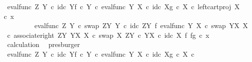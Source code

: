 \begin{isabellebody}
\ {\isachardoublequoteopen}{\isacharparenleft}{\kern0pt}{\isacharparenleft}{\kern0pt}{\isacharparenleft}{\kern0pt}eval{\isacharunderscore}{\kern0pt}func\ Z\ Y\ {\isasymcirc}\isactrlsub c\ {\isasymlangle}id\isactrlsub c\ Y{\isacharcomma}{\kern0pt}f\ {\isasymcirc}\isactrlsub c\ {\isasymbeta}\isactrlbsub Y\isactrlesub {\isasymrangle}{\isacharparenright}{\kern0pt}\ {\isasymcirc}\isactrlsub c\ eval{\isacharunderscore}{\kern0pt}func\ Y\ X\ {\isasymcirc}\isactrlsub c\ {\isasymlangle}id\isactrlsub c\ X{\isacharcomma}{\kern0pt}g\ {\isasymcirc}\isactrlsub c\ {\isasymbeta}\isactrlbsub X\isactrlesub {\isasymrangle}{\isacharparenright}{\kern0pt}\ {\isasymcirc}\isactrlsub c\ left{\isacharunderscore}{\kern0pt}cart{\isacharunderscore}{\kern0pt}proj\ X\ {\isasymone}{\isacharparenright}{\kern0pt}\ {\isasymcirc}\isactrlsub c\ x{}\ {\isacharequal}{\kern0pt}\isanewline
\ \ \ \ \ \ \ \ \ {\isacharparenleft}{\kern0pt}{\isacharparenleft}{\kern0pt}eval{\isacharunderscore}{\kern0pt}func\ Z\ Y\ {\isasymcirc}\isactrlsub c\ swap\ {\isacharparenleft}{\kern0pt}Z\isactrlbsup Y\isactrlesup {\isacharparenright}{\kern0pt}\ Y\ {\isasymcirc}\isactrlsub c\ {\isacharparenleft}{\kern0pt}id\isactrlsub c\ {\isacharparenleft}{\kern0pt}Z\isactrlbsup Y\isactrlesup {\isacharparenright}{\kern0pt}\ {\isasymtimes}\isactrlsub f\ eval{\isacharunderscore}{\kern0pt}func\ Y\ X\ {\isasymcirc}\isactrlsub c\ swap\ {\isacharparenleft}{\kern0pt}Y\isactrlbsup X\isactrlesup {\isacharparenright}{\kern0pt}\ X{\isacharparenright}{\kern0pt}\ {\isasymcirc}\isactrlsub c\ associate{\isacharunderscore}{\kern0pt}right\ {\isacharparenleft}{\kern0pt}Z\isactrlbsup Y\isactrlesup {\isacharparenright}{\kern0pt}\ {\isacharparenleft}{\kern0pt}Y\isactrlbsup X\isactrlesup {\isacharparenright}{\kern0pt}\ X\ {\isasymcirc}\isactrlsub c\ swap\ X\ {\isacharparenleft}{\kern0pt}Z\isactrlbsup Y\isactrlesup \ {\isasymtimes}\isactrlsub c\ Y\isactrlbsup X\isactrlesup {\isacharparenright}{\kern0pt}{\isacharparenright}{\kern0pt}\ {\isasymcirc}\isactrlsub c\ id\isactrlsub c\ X\ {\isasymtimes}\isactrlsub f\ {\isasymlangle}f{\isacharcomma}{\kern0pt}g{\isasymrangle}{\isacharparenright}{\kern0pt}\ {\isasymcirc}\isactrlsub c\ x{}{\isachardoublequoteclose}\isanewline
\ \ \ \ \ \ \isamarkupfalse%
\ calculation\ \isamarkupfalse%
\ presburger\isanewline
\ \ \isamarkupfalse%
\isanewline
\ \ \isamarkupfalse%
\ \isamarkupfalse%
\ {\isachardoublequoteopen}{\isacharparenleft}{\kern0pt}{\isacharparenleft}{\kern0pt}{\isacharparenleft}{\kern0pt}eval{\isacharunderscore}{\kern0pt}func\ Z\ Y\ {\isasymcirc}\isactrlsub c\ {\isasymlangle}id\isactrlsub c\ Y{\isacharcomma}{\kern0pt}f\ {\isasymcirc}\isactrlsub c\ {\isasymbeta}\isactrlbsub Y\isactrlesub {\isasymrangle}{\isacharparenright}{\kern0pt}\ {\isasymcirc}\isactrlsub c\ eval{\isacharunderscore}{\kern0pt}func\ Y\ X\ {\isasymcirc}\isactrlsub c\ {\isasymlangle}id\isactrlsub c\ X{\isacharcomma}{\kern0pt}g\ {\isasymcirc}\isactrlsub c\ {\isasymbeta}\isactrlbsub X\isactrlesub {\isasymrangle}{\isacharparenright}{\kern0pt}\ {\isasymcirc}\isactrlsub c\isanewline

\end{isabellebody}
